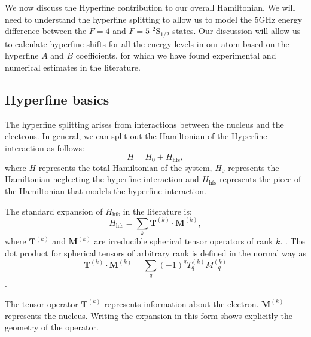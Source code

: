 We now discuss the Hyperfine contribution to our overall Hamiltonian. We will need to understand the hyperfine splitting to allow us to model the 5GHz energy difference between the $F=4$ and $F=5$ $^2$S$_{1/2}$ states. Our discussion will allow us to calculate hyperfine shifts for all the energy levels in our atom based on the hyperfine $A$ and $B$ coefficients, for which we have found experimental and numerical estimates in the literature.

\subsection{Hyperfine basics}

The hyperfine splitting arises from interactions between the nucleus and the electrons. In general, we can split out the Hamiltonian of the Hyperfine interaction as follows: 
\begin{equation}
H=H_0+H_{\mathrm{hfs}},
\end{equation}
where $H$ represents the total Hamiltonian of the system, $H_0$ represents the Hamiltonian neglecting the hyperfine interaction and $H_{\mathrm{hfs}}$ represents the piece of the Hamiltonian that models the hyperfine interaction. 

The standard expansion of $H_{\mathrm{hfs}}$ in the literature is:  
\begin{equation}
H_{\mathrm{hfs}}=\sum_k \mathbf{T}^{(k)} \cdot \mathbf{M}^{(k)} \label{hfs_hamiltonian_eqn},
\end{equation}
where $\mathbf{T}^{(k)}$ and $\mathbf{M}^{(k)}$ are irreducible spherical tensor operators of rank $k$.
\cite{schwartz_hyperfine_expansion}
\cite{experimental_hyperfine_alkali_arimondo}
\cite{chinesePhysics}.
The dot product for spherical tensors of arbitrary rank is defined in the normal way as
\begin{equation}\label{TkMk_hyperfine}
\mathbf{T}^{(k)}\cdot\mathbf{M}^{(k)}=\sum_q (-1)^qT_q^{(k)}M_{-q}^{(k)}
\end{equation}.

The tensor operator $\mathbf{T}^{(k)}$ represents information about the electron.
$\mathbf{M}^{(k)}$ represents the nucleus.\cite{experimental_hyperfine_alkali_arimondo}\cite{schwartz_hyperfine_expansion}
\cite{sobelman_spectra}
Writing the expansion in this form shows explicitly the geometry of the operator. 

